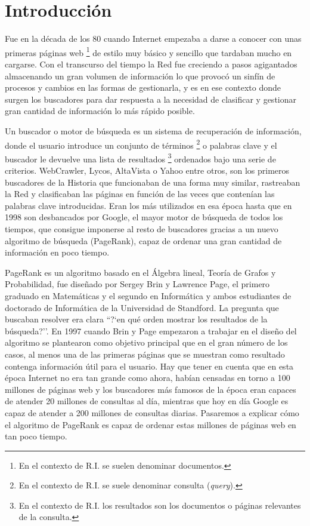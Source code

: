 \documentclass[size=a4, parskip=half, titlepage=false, toc=flat, toc=bib, 12pt]{scrartcl}
\theoremstyle{theorem-style}
\theoremstyle{definition-style}
\theoremstyle{remark-style}
\theoremstyle{example-style}
\theoremstyle{definition-style}
\theoremstyle{remark-style}
\begin{document}
\section{Introducción}
Fue en la década de los 80 cuando Internet empezaba a darse a conocer con unas primeras páginas web \footnote{En el contexto de R.I. se suelen denominar documentos.} de estilo muy básico y sencillo que tardaban mucho en cargarse. Con el transcurso del tiempo la Red fue creciendo a pasos agigantados almacenando un gran volumen de información lo que provocó  un sinfín de procesos y cambios en las formas de gestionarla, y es en ese contexto donde surgen los buscadores para dar respuesta a la necesidad de clasificar y gestionar gran cantidad de información lo más rápido posible.

Un buscador o motor de búsqueda es un sistema de recuperación de información, donde el usuario introduce un conjunto de términos \footnote{En el contexto de R.I. se suele denominar consulta (\textit{query}).} o palabras clave y el buscador le devuelve una lista de resultados \footnote{En el contexto de R.I. los resultados son los documentos o páginas relevantes de la consulta.} ordenados bajo una serie de criterios. WebCrawler, Lycos, AltaVista o Yahoo entre otros, son los primeros buscadores de la Historia que funcionaban de una forma muy similar, rastreaban la Red y clasificaban las páginas en función de las veces que contenían las palabras clave introducidas. Eran los más utilizados en esa época hasta que en 1998 son desbancados por Google, el mayor motor de búsqueda de todos los tiempos,  que consigue imponerse al resto de buscadores gracias a un nuevo algoritmo de búsqueda (PageRank), capaz de ordenar una gran cantidad de información en poco tiempo.

PageRank es un algoritmo basado en el Álgebra lineal, Teoría de Grafos y Probabilidad, fue diseñado por Sergey Brin y Lawrence Page, el primero graduado en Matemáticas y el segundo en Informática y ambos estudiantes de doctorado de Informática de la Universidad de Standford. La pregunta que buscaban resolver era clara ``?`en qué orden mostrar los resultados de la búsqueda?''. En 1997 cuando Brin y Page empezaron a trabajar en el diseño del algoritmo se plantearon como objetivo principal que en el gran número de los casos, al menos una de las primeras páginas que se muestran como resultado contenga información útil para el usuario. Hay que tener en cuenta que en esta época Internet no era tan grande como ahora, habían censadas en torno a 100 millones de páginas web y los buscadores más famosos de la época eran capaces de atender 20 millones de consultas al día, mientras que hoy en día Google es capaz de atender a 200 millones de consultas diarias. Pasaremos a explicar cómo el algoritmo de PageRank es capaz de ordenar estas millones de páginas web en tan poco tiempo.
\end{document}
